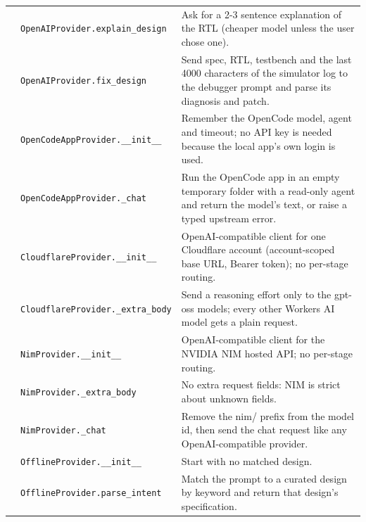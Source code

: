 \begin{longtable}{@{}p{2.8cm}>{\raggedright\arraybackslash}p{4.6cm}p{7.9cm}@{}}
{\small } & \texttt{\small OpenAIProvider.\allowbreak explain\_\allowbreak{}design} & Ask for a 2-3 sentence explanation of the RTL (cheaper model unless the user chose one). \\
{\small } & \texttt{\small OpenAIProvider.\allowbreak fix\_\allowbreak{}design} & Send spec, RTL, testbench and the last 4000 characters of the simulator log to the debugger prompt and parse its diagnosis and patch. \\
{\small } & \texttt{\small OpenCodeAppProvider.\allowbreak \_\allowbreak{}\_\allowbreak{}init\_\allowbreak{}\_\allowbreak{}} & Remember the OpenCode model, agent and timeout; no API key is needed because the local app's own login is used. \\
{\small } & \texttt{\small OpenCodeAppProvider.\allowbreak \_\allowbreak{}chat} & Run the OpenCode app in an empty temporary folder with a read-only agent and return the model's text, or raise a typed upstream error. \\
{\small } & \texttt{\small CloudflareProvider.\allowbreak \_\allowbreak{}\_\allowbreak{}init\_\allowbreak{}\_\allowbreak{}} & OpenAI-compatible client for one Cloudflare account (account-scoped base URL, Bearer token); no per-stage routing. \\
{\small } & \texttt{\small CloudflareProvider.\allowbreak \_\allowbreak{}extra\_\allowbreak{}body} & Send a reasoning effort only to the gpt-oss models; every other Workers AI model gets a plain request. \\
{\small } & \texttt{\small NimProvider.\allowbreak \_\allowbreak{}\_\allowbreak{}init\_\allowbreak{}\_\allowbreak{}} & OpenAI-compatible client for the NVIDIA NIM hosted API; no per-stage routing. \\
{\small } & \texttt{\small NimProvider.\allowbreak \_\allowbreak{}extra\_\allowbreak{}body} & No extra request fields: NIM is strict about unknown fields. \\
{\small } & \texttt{\small NimProvider.\allowbreak \_\allowbreak{}chat} & Remove the nim/ prefix from the model id, then send the chat request like any OpenAI-compatible provider. \\
{\small } & \texttt{\small OfflineProvider.\allowbreak \_\allowbreak{}\_\allowbreak{}init\_\allowbreak{}\_\allowbreak{}} & Start with no matched design. \\
{\small } & \texttt{\small OfflineProvider.\allowbreak parse\_\allowbreak{}intent} & Match the prompt to a curated design by keyword and return that design's specification. \\

\end{longtable}

